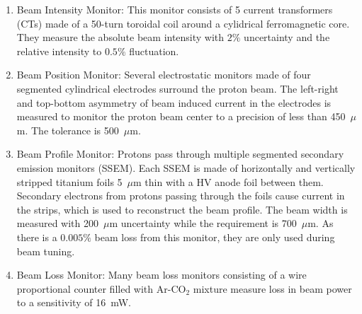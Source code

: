 \begin{enumerate}
\item Beam Intensity Monitor: This monitor consists of 5 current
  transformers (CTs) made of a 50-turn toroidal coil around a
  cylidrical ferromagnetic core. They measure the absolute beam
  intensity with $2\%$ uncertainty and the relative intensity to
  $0.5\%$ fluctuation. 
\item  Beam Position Monitor: Several electrostatic monitors made of
  four segmented cylindrical electrodes surround the proton beam. The
  left-right and top-bottom asymmetry of beam induced current in the
  electrodes is measured to monitor the proton beam center to a
  precision of less than 450~$\mu$m. The tolerance is 500~$\mu$m.
\item Beam Profile Monitor: Protons pass through multiple segmented secondary
  emission monitors (SSEM). Each SSEM is made of horizontally and
  vertically stripped titanium foils 5~$\mu$m thin with a HV anode
  foil between them. Secondary electrons from protons passing through the foils cause current
  in the strips, which is used to reconstruct the beam profile. The
  beam width is measured with 200~$\mu$m uncertainty while the requirement
  is 700~$\mu$m. As there is a $0.005\%$ beam loss from this monitor,
  they are only used during beam tuning.
\item Beam Loss Monitor: Many beam loss monitors consisting of a wire
  proportional counter filled with Ar-CO$_2$ mixture
  measure loss in beam power to a sensitivity of 16~mW.
\end{enumerate}

